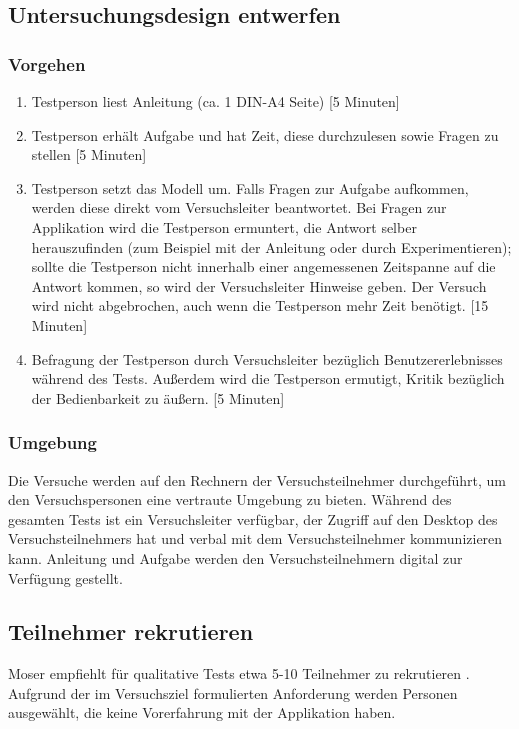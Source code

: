 \subsection{Untersuchungsdesign entwerfen}

\subsubsection*{Vorgehen}
\begin{enumerate}
    \item Testperson liest Anleitung (ca. 1 DIN-A4 Seite) [5 Minuten]
    \item Testperson erhält Aufgabe und hat Zeit, diese durchzulesen sowie Fragen zu stellen [5 Minuten]
    \item Testperson setzt das Modell um. Falls Fragen zur Aufgabe aufkommen, werden diese direkt vom Versuchsleiter beantwortet. Bei Fragen zur Applikation wird die Testperson ermuntert, die Antwort selber herauszufinden (zum Beispiel mit der Anleitung oder durch Experimentieren); sollte die Testperson nicht innerhalb einer angemessenen Zeitspanne auf die Antwort kommen, so wird der Versuchsleiter Hinweise geben. Der Versuch wird nicht abgebrochen, auch wenn die Testperson mehr Zeit benötigt. [15 Minuten]
    \item Befragung der Testperson durch Versuchsleiter bezüglich Benutzererlebnisses während des Tests. Außerdem wird die Testperson ermutigt, Kritik bezüglich der Bedienbarkeit zu äußern. [5 Minuten]
\end{enumerate}

\subsubsection*{Umgebung}
Die Versuche werden auf den Rechnern der Versuchsteilnehmer durchgeführt, um den Versuchspersonen eine vertraute Umgebung zu bieten. Während des gesamten Tests ist ein Versuchsleiter verfügbar, der Zugriff auf den Desktop des Versuchsteilnehmers hat und verbal mit dem Versuchsteilnehmer kommunizieren kann. Anleitung und Aufgabe werden den Versuchsteilnehmern digital zur Verfügung gestellt.

\subsection{Teilnehmer rekrutieren}

Moser empfiehlt für qualitative Tests etwa 5-10 Teilnehmer zu rekrutieren \cite{Moser2012}. Aufgrund der im Versuchsziel formulierten Anforderung werden Personen ausgewählt, die keine Vorerfahrung mit der Applikation haben.

